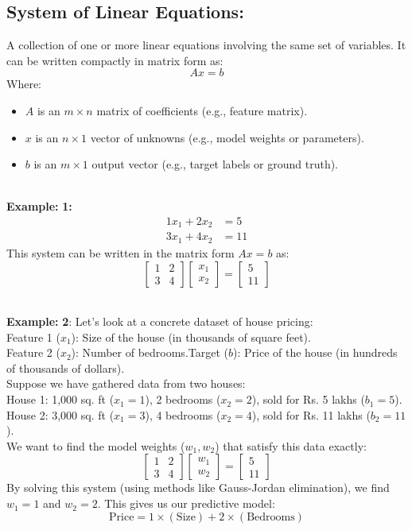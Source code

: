 \documentclass[DIV=20,oneside]{scrartcl}
\newcommand{\example}{
	\noindent\textbf{\\Example: }
}
\begin{document}
		\subsection{System of Linear Equations:} A collection of one or more linear equations involving the same set of variables. It can be written compactly in matrix form as:$$Ax = b$$
		Where:
		\begin{itemize}[itemsep=0.5pt, topsep=1pt]
			\item $A$ is an $m \times n$ matrix of coefficients (e.g., feature matrix).
			\item $x$ is an $n \times 1$ vector of unknowns (e.g., model weights or parameters).
			\item $b$ is an $m \times 1$ output vector (e.g., target labels or ground truth).
		\end{itemize}
		\example \textbf{1:}
		$$\begin{aligned}
			1x_1 + 2x_2 &= 5 \\
			3x_1 + 4x_2 &= 11
		\end{aligned}$$
		This system can be written in the matrix form $Ax = b$ as:
		$$\begin{bmatrix} 1 & 2 \\ 3 & 4 \end{bmatrix} \begin{bmatrix} x_1 \\ x_2 \end{bmatrix} = \begin{bmatrix} 5 \\ 11 \end{bmatrix}$$
		\example \textbf{2}:
		Let's look at a concrete dataset of house pricing: \\Feature 1 ($x_1$): Size of the house (in thousands of square feet). \\
		Feature 2 ($x_2$): Number of bedrooms.Target ($b$): 
		Price of the house (in hundreds of thousands of dollars). 
		\\
		Suppose we have gathered data from two houses:\\
		House 1: 1,000 sq. ft ($x_1 = 1$), 2 bedrooms ($x_2 = 2$), sold for Rs. 5 lakhs ($b_1 = 5$).\\
		House 2: 3,000 sq. ft ($x_1 = 3$), 4 bedrooms ($x_2 = 4$), sold for Rs. 11 lakhs ($b_2 = 11$).
		\\
		We want to find the model weights ($w_1, w_2$) that satisfy this data exactly:$$\begin{bmatrix} 1 & 2 \\ 3 & 4 \end{bmatrix} \begin{bmatrix} w_1 \\ w_2 \end{bmatrix} = \begin{bmatrix} 5 \\ 11 \end{bmatrix}$$By solving this system (using methods like Gauss-Jordan elimination), we find $w_1 = 1$ and $w_2 = 2$. This gives us our predictive model:
		$$\text{Price} = 1 \times (\text{Size}) + 2 \times (\text{Bedrooms})$$
\end{document}
